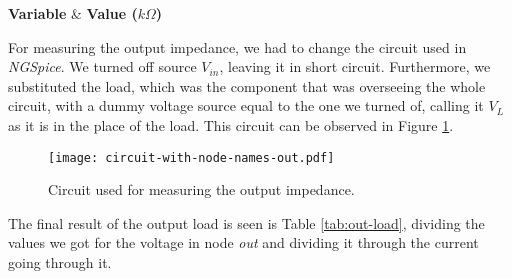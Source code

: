 \begin{tabular} \label{tab:zin}
  \hline    
  {\bf Variable} & {\bf Value ($k\Omega$)} \\ \hline
  
\end{tabular}

For measuring the output impedance, we had to change the circuit used in \textit{NGSpice}. We turned off source $V_{in}$, leaving it in short circuit. Furthermore, we substituted the load, which was the component that was overseeing the whole circuit, with a dummy voltage source equal to the one we turned of, calling it $V_L$ as it is in the place of the load. This circuit can be observed in Figure \ref{fig:circuit-2-spice}.

\begin{figure}[h] \centering
\texttt{[image: circuit-with-node-names-out.pdf]}
\caption{Circuit used for measuring the output impedance.}
\label{fig:circuit-2-spice}
\end{figure}

The final result of the output load is seen is Table \ref{tab:out-load}, dividing the values we got for the voltage in node \textit{out} and dividing it through the current going through it.